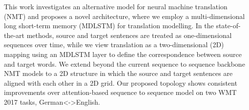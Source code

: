 This work investigates an alternative model for neural machine translation (NMT) and proposes a novel architecture, where we employ a multi-dimensional long short-term memory (MDLSTM) for translation modelling. In the state-of-the-art methods, source and target sentences are treated as one-dimensional sequences over time, while we view translation as a two-dimensional (2D) mapping using an MDLSTM layer to define the correspondence between source and target words. We extend beyond the current sequence to sequence backbone NMT models to a 2D structure in which the source and target sentences are aligned with each other in a 2D grid. Our proposed topology shows consistent improvements over attention-based sequence to sequence model on two WMT 2017 tasks, German<->English.
